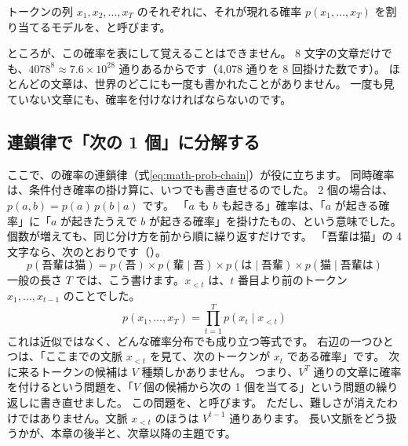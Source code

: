 \begin{definition}[言語モデル]\label{def:lm-lm}
トークンの列 $x_1,x_2,\dots,x_T$ のそれぞれに、それが現れる確率 $p(x_1,\dots,x_T)$ を割り当てるモデルを、と呼びます。
\end{definition}

ところが、この確率を表にして覚えることはできません。
8 文字の文章だけでも、$4078^{8}\approx 7.6\times10^{28}$ 通りあるからです（4,078 通りを 8 回掛けた数です）。
ほとんどの文章は、世界のどこにも一度も書かれたことがありません。
一度も見ていない文章にも、確率を付けなければならないのです。

\subsection*{連鎖律で「次の 1 個」に分解する}

ここで、の確率の連鎖律（式\eqref{eq:math-prob-chain}）が役に立ちます。
同時確率は、条件付き確率の掛け算に、いつでも書き直せるのでした。
2 個の場合は、$p(a,b)=p(a)\,p(b\mid a)$ です。
「$a$ も $b$ も起きる」確率は、「$a$ が起きる確率」に「$a$ が起きたうえで $b$ が起きる確率」を掛けたもの、という意味でした。
個数が増えても、同じ分け方を前から順に繰り返すだけです。
「吾輩は猫」の 4 文字なら、次のとおりです（）。
\begin{equation*}
p(\text{吾輩は猫})
= p(\text{吾})\times p(\text{輩}\mid\text{吾})\times p(\text{は}\mid\text{吾輩})\times p(\text{猫}\mid\text{吾輩は})
\end{equation*}
一般の長さ $T$ では、こう書けます。$x_{<t}$ は、$t$ 番目より前のトークン $x_1,\dots,x_{t-1}$ のことでした。
\begin{equation}
p(x_1,\dots,x_T)=\prod_{t=1}^{T}p(x_t\mid x_{<t})
\label{eq:lm-chain}
\end{equation}
これは近似ではなく、どんな確率分布でも成り立つ等式です。
右辺の一つひとつは、「ここまでの文脈 $x_{<t}$ を見て、次のトークンが $x_t$ である確率」です。
次に来るトークンの候補は $V$ 種類しかありません。
つまり、$V^{T}$ 通りの文章に確率を付けるという問題を、「$V$ 個の候補から次の 1 個を当てる」という問題の繰り返しに書き直せました。
この問題を、と呼びます。
ただし、難しさが消えたわけではありません。文脈 $x_{<t}$ のほうは $V^{t-1}$ 通りあります。
長い文脈をどう扱うかが、本章の後半と、次章以降の主題です。

